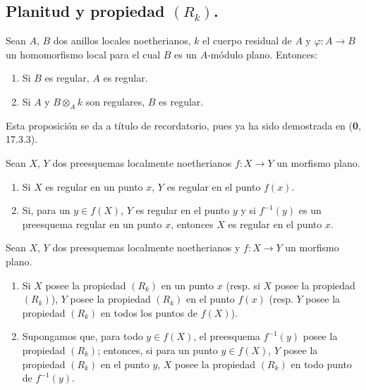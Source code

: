
\subsection{\texorpdfstring{Planitud y propiedad $(R_k)$.}{Planitud y propiedad (R\string_k)}}

\begin{proposition}[6.5.1]
Sean $A$, $B$ dos anillos locales noetherianos, $k$ el cuerpo residual
de $A$ y $\varphi:A\to B$ un homomorfismo local para el cual $B$ es un
$A$-módulo plano. Entonces:
\begin{enumerate}
\item[\textup{(i)}] Si $B$ es regular, $A$ es regular.
\item[\textup{(ii)}] Si $A$ y $B\otimes_Ak$ son regulares, $B$ es regular.
\end{enumerate}
\end{proposition}

Esta proposición se da a título de recordatorio, pues ya ha sido demostrada en
(\textbf{0}, 17.3.3).

\begin{corollary}[6.5.2]
\label{IV.2.s6.5.2-fr}
Sean $X$, $Y$ dos preesquemas localmente noetherianos $f:X\to Y$
un morfismo plano.
\begin{enumerate}
\item[\textup{(i)}] Si $X$ es regular en un punto $x$, $Y$ es regular en el punto
$f(x)$.
\item[\textup{(ii)}] Si, para un $y\in f(X)$, $Y$ es regular en el punto $y$ y si
$f^{-1}(y)$ es un preesquema regular en un punto $x$, entonces $X$ es
regular en el punto $x$.
\end{enumerate}
\end{corollary}

\begin{proposition}[6.5.3]
\label{IV.2.s6.5.3-fr}
Sean $X$, $Y$ dos preesquemas localmente noetherianos y $f:X\to Y$
un morfismo plano.
\begin{enumerate}
\item[\textup{(i)}] Si $X$ posee la propiedad $(R_k)$ en un punto $x$
\textup{(resp.} si $X$ posee la propiedad $(R_k)$), $Y$ posee la propiedad
$(R_k)$ en el punto $f(x)$ \textup{(resp.} $Y$ posee la propiedad $(R_k)$ en todos
los puntos de $f(X)$).
\item[\textup{(ii)}] Supongamos que, para todo $y\in f(X)$, el preesquema
$f^{-1}(y)$ posee la propiedad $(R_k)$; entonces, si para un punto
$y\in f(X)$, $Y$ posee la propiedad $(R_k)$ en el punto $y$, $X$ posee
la propiedad $(R_k)$ en todo punto de $f^{-1}(y)$.
\end{enumerate}
\end{proposition}

